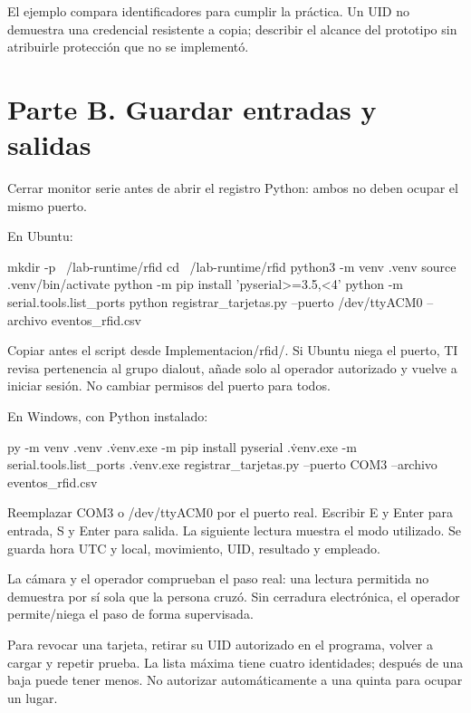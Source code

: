 \documentclass[12pt,a4paper]{article}
\begin{document}
El ejemplo compara identificadores para cumplir la práctica. Un UID no demuestra una credencial resistente a copia; describir el alcance del prototipo sin atribuirle protección que no se implementó.\par
{}\section*{Parte B. Guardar entradas y salidas}
Cerrar monitor serie antes de abrir el registro Python: ambos no deben ocupar el mismo puerto.\par
En Ubuntu:\par
{}
\begin{Comandos}
mkdir -p ~/lab-runtime/rfid
cd ~/lab-runtime/rfid
python3 -m venv .venv
source .venv/bin/activate
python -m pip install 'pyserial>=3.5,<4'
python -m serial.tools.list_ports
python registrar_tarjetas.py --puerto /dev/ttyACM0 --archivo eventos_rfid.csv
\end{Comandos}
Copiar antes el script desde \textnormal{Implementacion/\allowbreak{}rfid/\allowbreak{}}. Si Ubuntu niega el puerto, TI revisa pertenencia al grupo \textnormal{dialout}, añade solo al operador autorizado y vuelve a iniciar sesión. No cambiar permisos del puerto para todos.\par
En Windows, con Python instalado:\par
{}
\begin{Comandos}
py -m venv .venv
.\.venv\Scripts\python.exe -m pip install pyserial
.\.venv\Scripts\python.exe -m serial.tools.list_ports
.\.venv\Scripts\python.exe registrar_tarjetas.py --puerto COM3 --archivo eventos_rfid.csv
\end{Comandos}
Reemplazar COM3 o \textnormal{/\allowbreak{}dev/\allowbreak{}ttyACM0} por el puerto real. Escribir E y Enter para entrada, S y Enter para salida. La siguiente lectura muestra el modo utilizado. Se guarda hora UTC y local, movimiento, UID, resultado y empleado.\par
La cámara y el operador comprueban el paso real: una lectura permitida no demuestra por sí sola que la persona cruzó. Sin cerradura electrónica, el operador permite/niega el paso de forma supervisada.\par
Para revocar una tarjeta, retirar su UID autorizado en el programa, volver a cargar y repetir prueba. La lista máxima tiene cuatro identidades; después de una baja puede tener menos. No autorizar automáticamente a una quinta para ocupar un lugar.\par
\end{document}
